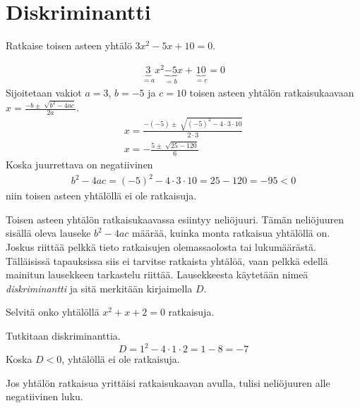 \chapter{Diskriminantti}
\begin{esimerkki}
Ratkaise toisen asteen yhtälö $3x^2-5x+10=0$.

\begin{align*}
\underbrace{3}_{=a}x^2\underbrace{-5}_{=b}x+\underbrace{10}_{=c}=0
\end{align*}
Sijoitetaan vakiot $a=3$, $b=-5$ ja $c=10$ toisen asteen yhtälön ratkaisukaavaan $x=\frac{-b \pm \sqrt[]{b^2-4ac}}{2a}$. 
\begin{align*}
x=\frac{-(-5) \pm \sqrt[]{(-5)^2-4\cdot 3 \cdot 10}}{2 \cdot 3} \\
x=-\frac{5 \pm \sqrt[]{25-120}}{6}
\end{align*}
Koska juurrettava on negatiivinen 
\begin{align*}
b^2-4ac=(-5)^2-4 \cdot 3 \cdot 10=25-120=-95<0
\end{align*}
niin toisen asteen yhtälöllä ei ole ratkaisuja.
\end{esimerkki}
%
%
Toisen asteen yhtälön ratkaisukaavassa esiintyy neliöjuuri. Tämän neliöjuuren sisällä oleva lauseke $b^2-4ac$ määrää, kuinka monta ratkaisua yhtälöllä on. Joskus riittää pelkkä tieto ratkaisujen olemassaolosta tai lukumäärästä. Tälläisissä tapauksissa siis ei tarvitse ratkaista yhtälöä, vaan pelkkä edellä mainitun lausekkeen tarkastelu riittää. Lausekkeesta käytetään nimeä \emph{diskriminantti} ja sitä merkitään kirjaimella $D$.

\begin{esimerkki}
Selvitä onko yhtälöllä $x^2+x+2=0$ ratkaisuja.

Tutkitaan diskriminanttia.
\[D=1^2-4\cdot 1 \cdot 2 = 1-8 = -7\]
Koska $D<0$, yhtälöllä ei ole ratkaisuja.

Jos yhtälön ratkaisua yrittäisi ratkaisukaavan avulla, tulisi neliöjuuren alle negatiivinen luku.
\end{esimerkki}

